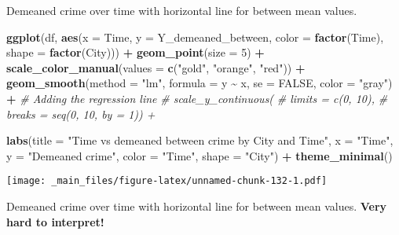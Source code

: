 \documentclass[
]{book}
\newenvironment{Shaded}{\begin{snugshade}}{\end{snugshade}}
\newcommand{\AttributeTok}[1]{\textcolor[rgb]{0.13,0.29,0.53}{#1}}
\newcommand{\CommentTok}[1]{\textcolor[rgb]{0.56,0.35,0.01}{\textit{#1}}}
\newcommand{\ConstantTok}[1]{\textcolor[rgb]{0.56,0.35,0.01}{#1}}
\newcommand{\DecValTok}[1]{\textcolor[rgb]{0.00,0.00,0.81}{#1}}
\newcommand{\FunctionTok}[1]{\textcolor[rgb]{0.13,0.29,0.53}{\textbf{#1}}}
\newcommand{\NormalTok}[1]{#1}
\newcommand{\SpecialCharTok}[1]{\textcolor[rgb]{0.81,0.36,0.00}{\textbf{#1}}}
\newcommand{\StringTok}[1]{\textcolor[rgb]{0.31,0.60,0.02}{#1}}
\begin{document}
Demeaned crime over time with horizontal line for between mean values.

\begin{Shaded}
\begin{Highlighting}[]
\FunctionTok{ggplot}\NormalTok{(df, }\FunctionTok{aes}\NormalTok{(}\AttributeTok{x =}\NormalTok{ Time, }\AttributeTok{y =}\NormalTok{ Y\_demeaned\_between, }\AttributeTok{color =} \FunctionTok{factor}\NormalTok{(Time), }\AttributeTok{shape =} \FunctionTok{factor}\NormalTok{(City))) }\SpecialCharTok{+}
  \FunctionTok{geom\_point}\NormalTok{(}\AttributeTok{size =} \DecValTok{5}\NormalTok{) }\SpecialCharTok{+}
  \FunctionTok{scale\_color\_manual}\NormalTok{(}\AttributeTok{values =} \FunctionTok{c}\NormalTok{(}\StringTok{"gold"}\NormalTok{, }\StringTok{"orange"}\NormalTok{, }\StringTok{"red"}\NormalTok{)) }\SpecialCharTok{+}
  \FunctionTok{geom\_smooth}\NormalTok{(}\AttributeTok{method =} \StringTok{"lm"}\NormalTok{, }\AttributeTok{formula =}\NormalTok{ y }\SpecialCharTok{\textasciitilde{}}\NormalTok{ x, }\AttributeTok{se =} \ConstantTok{FALSE}\NormalTok{, }\AttributeTok{color =} \StringTok{"gray"}\NormalTok{) }\SpecialCharTok{+}  \CommentTok{\# Adding the regression line}
  \CommentTok{\# scale\_y\_continuous(}
  \CommentTok{\# limits = c(0, 10),}
  \CommentTok{\# breaks = seq(0, 10, by = 1)) +}
  
  \FunctionTok{labs}\NormalTok{(}\AttributeTok{title =} \StringTok{"Time vs demeaned between crime by City and Time"}\NormalTok{,}
       \AttributeTok{x =} \StringTok{"Time"}\NormalTok{,}
       \AttributeTok{y =} \StringTok{"Demeaned crime"}\NormalTok{,}
       \AttributeTok{color =} \StringTok{"Time"}\NormalTok{,}
       \AttributeTok{shape =} \StringTok{"City"}\NormalTok{) }\SpecialCharTok{+}
  \FunctionTok{theme\_minimal}\NormalTok{()}
\end{Highlighting}
\end{Shaded}

\texttt{[image: \_main\_files/figure-latex/unnamed-chunk-132-1.pdf]}

Demeaned crime over time with horizontal line for between mean values. \textbf{Very hard to interpret!}
\end{document}
